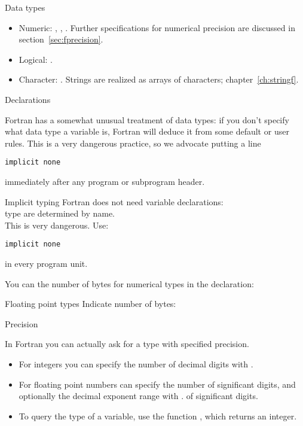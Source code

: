 \begin{block}{Data types}
  \begin{itemize}
  \item Numeric: , ,
    . Further specifications for numerical
    precision are discussed in section~\ref{sec:fprecision}.
  \item Logical: .
  \item Character: . Strings are realized as
    arrays of characters; chapter~\ref{ch:stringf}.
  \end{itemize}  
\end{block}

 {Declarations}
\label{sec:ftype}

Fortran has a somewhat unusual treatment of data types: if you don't
specify what data type a variable is, Fortran will deduce it from some
default or user rules. This is a very dangerous practice, so we
advocate putting a line
\begin{verbatim}
implicit none
\end{verbatim}
immediately after any program or subprogram header.

\begin{slide}{Implicit typing}
  \label{sl:fimplicit}
  Fortran does not need variable declarations:\\
  type are determined by name.\\
  This is very dangerous. Use:
\begin{verbatim}
implicit none
\end{verbatim}
  in every program unit.
\end{slide}

You can the number of bytes for numerical types in the declaration:
%

\begin{slide}{Floating point types}
  \label{sl:ffloat}
  Indicate number of bytes:
\end{slide}

 {Precision}
\label{sec:fprecision}

In Fortran you can actually ask for a type with specified precision.
\begin{itemize}
\item For integers you can specify the number of decimal digits with
  .
\item For floating point numbers can specify the number of
  significant digits, and optionally the decimal exponent range with
  .
  of significant digits.
\item To query the type of a variable, use the function
  , which returns an integer.
\end{itemize}

